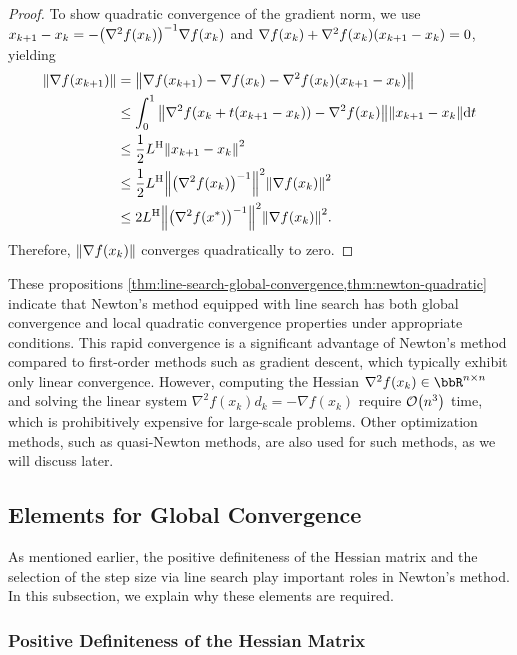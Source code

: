 \documentclass[en]{subfiles}
\begin{document}
\begin{proof}
    To show quadratic convergence of the gradient norm, we use $x_{k+1}-x_k=-\qty(\nabla^2 f(x_k))^{-1}\nabla f(x_k)$ and
    $\nabla f(x_k)+\nabla^2 f(x_k)\qty(x_{k+1}-x_k)=0$, yielding
    \begin{align*}
        \norm{\nabla f(x_{k+1})}
         & = \norm{\nabla f(x_{k+1})-\nabla f(x_k)-\nabla^2 f(x_k)\qty(x_{k+1}-x_k)}                  \\
         & \le \int_0^1 \norm{\nabla^2 f(x_k+t (x_{k+1}-x_k))-\nabla^2 f(x_k)}\norm{x_{k+1}-x_k}\dd t \\
         & \le \frac{1}{2}L^{\mathrm{H}}\norm{x_{k+1}-x_k}^2                                          \\
         & \le \frac{1}{2}L^{\mathrm{H}}\norm{\qty(\nabla^2 f(x_k))^{-1}}^2\norm{\nabla f(x_k)}^2     \\
         & \le 2 L^{\mathrm{H}} \norm{\qty(\nabla^2 f(x^*))^{-1}}^2\norm{\nabla f(x_k)}^2.
    \end{align*}
    Therefore, $\norm{\nabla f(x_k)}$ converges quadratically to zero.
\end{proof}

These propositions \cref{thm:line-search-global-convergence,thm:newton-quadratic} indicate that Newton's method equipped with line search has both global convergence and local quadratic convergence properties under appropriate conditions.
This rapid convergence is a significant advantage of Newton's method compared to first-order methods such as gradient descent, which typically exhibit only linear convergence.
However, computing the Hessian $\nabla^2 f(x_k) \in \bbR^{n \times n}$ and solving the linear system $\nabla^2 f(x_k) d_k = -\nabla f(x_k)$ require $\order{n^3}$ time, which is prohibitively expensive for large-scale problems.
Other optimization methods, such as quasi-Newton methods, are also used for such methods, as we will discuss later.

\subsection{Elements for Global Convergence}

As mentioned earlier, the positive definiteness of the Hessian matrix and the selection of the step size via line search play important roles in Newton's method.
In this subsection, we explain why these elements are required.

\subsubsection{Positive Definiteness of the Hessian Matrix}
\end{document}
